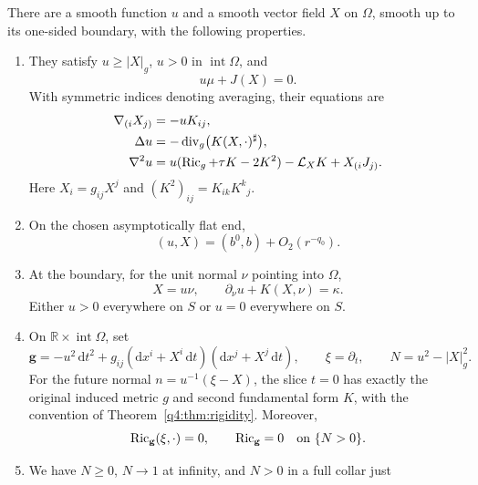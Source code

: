 \begin{theorem}
\label{q4:adj:causal-field}
There are a smooth function $u$ and a smooth vector field $X$ on $\Omega$,
smooth up to its one-sided boundary, with the following properties.
\begin{enumerate}[label=\textup{(\roman*)}]
\item They satisfy $u\ge |X|_g$, $u>0$ in $\operatorname{int}\Omega$, and
\begin{equation}
 u\mu+J(X)=0.
 \label{q4:adj:complementarity}
\end{equation}
With symmetric indices denoting averaging, their equations are
\begin{align}
 \nabla_{(i}X_{j)}&=-uK_{ij},
 \label{q4:adj:kid-first}\\
 \Delta u&=-\operatorname{div}_g\bigl(K(X,\cdot)^\sharp\bigr),
 \label{q4:adj:conformal-adjoint}\\
 \nabla^2u
 &=u(\operatorname{Ric}_g+\tau K-2K^2)-\mathcal L_XK+X_{(i}J_{j)}.
 \label{q4:adj:kid-second}
\end{align}
Here $X_i=g_{ij}X^j$ and $(K^2)_{ij}=K_{ik}K^k{}_j$.
\item On the chosen asymptotically flat end,
\begin{equation}
 (u,X)=(b^0,b)+O_2(r^{-q_0}).
 \label{q4:adj:decay}
\end{equation}
\item At the boundary, for the unit normal $\nu$ pointing into $\Omega$,
\begin{equation}
 X=u\nu,\qquad
 \partial_\nu u+K(X,\nu)=\kappa.
 \label{q4:adj:horizon-data}
\end{equation}
Either $u>0$ everywhere on $S$ or $u=0$ everywhere on $S$.
\item On $\mathbb R\times\operatorname{int}\Omega$, set
\begin{equation}
 \mathbf g=-u^2\,\mathrm dt^2
   +g_{ij}(\mathrm dx^i+X^i\,\mathrm dt)
          (\mathrm dx^j+X^j\,\mathrm dt),
 \qquad \xi=\partial_t,\qquad N=u^2-|X|_g^2.
 \label{q4:adj:stationary-metric}
\end{equation}
For the future normal $n=u^{-1}(\xi-X)$, the slice $t=0$ has exactly the
original induced metric $g$ and second fundamental form $K$, with the convention
of Theorem~\ref{q4:thm:rigidity}.  Moreover,
\begin{equation}
 \operatorname{Ric}_{\mathbf g}(\xi,\cdot)=0,
 \qquad \operatorname{Ric}_{\mathbf g}=0\quad\hbox{on }\{N>0\}.
 \label{q4:adj:ricci}
\end{equation}
\item We have $N\ge0$, $N\to1$ at infinity, and $N>0$ in a full collar just

\end{enumerate}
\end{theorem}
